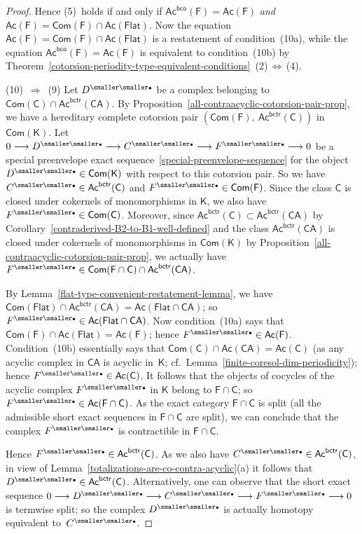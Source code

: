 \documentclass[12pt,a4paper]{amsart}
\newcommand{\+}{\nobreakdash-}
\renewcommand{\:}{\colon}
\newcommand{\rarrow}{\longrightarrow}
\newcommand{\bu}{{\text{\smaller\smaller$\scriptstyle\bullet$}}}
\newcommand{\sC}{\mathsf C}
\newcommand{\sF}{\mathsf F}
\newcommand{\sK}{\mathsf K}
\newcommand{\CA}{\mathsf{CA}}
\newcommand{\Flat}{\mathsf{Flat}}
\newcommand{\Com}{\mathsf{Com}}
\newcommand{\Ac}{\mathsf{Ac}}
\newcommand{\bco}{\mathsf{bco}}
\newcommand{\bctr}{\mathsf{bctr}}
\theoremstyle{plain}
\theoremstyle{definition}
\begin{document}
\begin{proof}
 Hence (5)~holds if and only if $\Ac^\bco(\sF)=\Ac(\sF)$ \emph{and}
$\Ac(\sF)=\Com(\sF)\cap\Ac(\Flat)$.
 Now the equation $\Ac(\sF)=\Com(\sF)\cap\Ac(\Flat)$ is a restatement
of condition~(10a), while the equation $\Ac^\bco(\sF)=\Ac(\sF)$
is equivalent to condition~(10b) by
Theorem~\ref{cotorsion-periodity-type-equivalent-conditions}\,%
(2)\,$\Leftrightarrow$\,(4).

 (10)~$\Longrightarrow$~(9)
 Let $D^\bu$ be a complex belonging to $\Com(\sC)\cap\Ac^\bctr(\CA)$.
 By Proposition~\ref{all-contraacyclic-cotorsion-pair-prop}, we have
a hereditary complete cotorsion pair $(\Com(\sF),\>\Ac^\bctr(\sC))$
in $\Com(\sK)$.
 Let $0\rarrow D^\bu\rarrow C^\bu\rarrow F^\bu\rarrow0$ be a special
preenvelope exact sequence~\eqref{special-preenvelope-sequence} for
the object $D^\bu\in\Com(\sK)$ with respect to this cotorsion pair.
 So we have $C^\bu\in\Ac^\bctr(\sC)$ and $F^\bu\in\Com(\sF)$.
 Since the class $\sC$ is closed under cokernels of monomorphisms in
$\sK$, we also have $F^\bu\in\Com(\sC)$.
 Moreover, since $\Ac^\bctr(\sC)\subset\Ac^\bctr(\CA)$ by
Corollary~\ref{contraderived-B2-to-B1-well-defined} and the class
$\Ac^\bctr(\CA)$ is closed under cokernels of monomorphisms in
$\Com(\sK)$ by Proposition~\ref{all-contraacyclic-cotorsion-pair-prop},
we actually have $F^\bu\in\Com(\sF\cap\sC)\cap\Ac^\bctr(\CA)$.

 By Lemma~\ref{flat-type-convenient-restatement-lemma}, we have
$\Com(\Flat)\cap\Ac^\bctr(\CA)=\Ac(\Flat\cap\CA)$; so
$F^\bu\in\Ac(\Flat\cap\CA)$.
 Now condition~(10a) says that $\Com(\sF)\cap\Ac(\Flat)=\Ac(\sF)$;
hence $F^\bu\in\Ac(\sF)$.
 Condition~(10b) essentially says that $\Com(\sC)\cap\Ac(\CA)=\Ac(\sC)$
(as any acyclic complex in $\CA$ is acyclic in~$\sK$;
cf.\ Lemma~\ref{finite-coresol-dim-periodicity});
hence $F^\bu\in\Ac(\sC)$.
 It follows that the objects of cocycles of the acyclic complex $F^\bu$
in $\sK$ belong to $\sF\cap\sC$; so $F^\bu\in\Ac(\sF\cap\sC)$.
 As the exact category $\sF\cap\sC$ is split (all the admissible short
exact sequences in $\sF\cap\sC$ are split), we can conclude that
the complex $F^\bu$ is contractible in $\sF\cap\sC$.

 Hence $F^\bu\in\Ac^\bctr(\sC)$.
 As we also have $C^\bu\in\Ac^\bctr(\sC)$, in view of
Lemma~\ref{totalizations-are-co-contra-acyclic}(a) it follows that
$D^\bu\in\Ac^\bctr(\sC)$.
 Alternatively, one can observe that the short exact sequence
$0\rarrow D^\bu\rarrow C^\bu\rarrow F^\bu\rarrow0$ is termwise split;
so the complex $D^\bu$ is actually homotopy equivalent to~$C^\bu$.


\end{proof}
\end{document}
